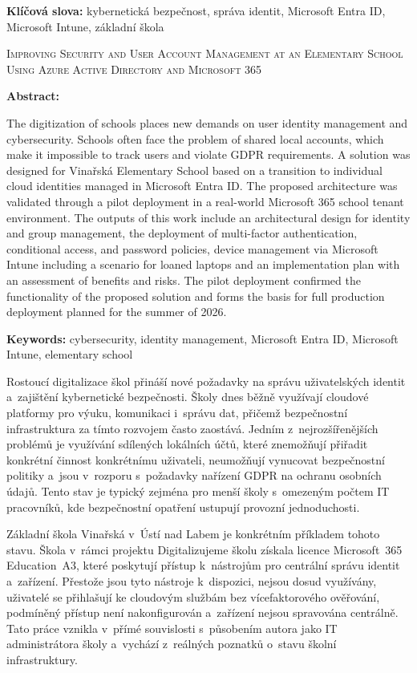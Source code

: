 \documentclass[male,czech,api_bc]{kitheses}
\newcommand{\nazeven}{Improving Security and User Account Management at an Elementary School Using Azure Active Directory and Microsoft 365}   %
\begin{document}
\textbf{Klíčová slova:} kybernetická bezpečnost, správa identit, Microsoft Entra ID, Microsoft Intune, základní škola

\bigskip


\textsc{\nazeven}

\textbf{Abstract:}

The digitization of schools places new demands on user identity management and cybersecurity. Schools often face the problem of shared local accounts, which make it impossible to track users and violate GDPR requirements.
A solution was designed for Vinařská Elementary School based on a transition to individual cloud identities managed in Microsoft Entra ID. The proposed architecture was validated through a pilot deployment in a real-world Microsoft 365 school tenant environment.
The outputs of this work include an architectural design for identity and group management, the deployment of multi-factor authentication, conditional access, and password policies, device management via Microsoft Intune including a scenario for loaned laptops and an implementation plan with an assessment of benefits and risks.
The pilot deployment confirmed the functionality of the proposed solution and forms the basis for full production deployment planned for the summer of 2026.

\textbf{Keywords:} cybersecurity, identity management, Microsoft Entra ID, Microsoft Intune, elementary school

\tableofcontents

Rostoucí digitalizace škol přináší nové požadavky na správu uživatelských 
identit a~zajištění kybernetické bezpečnosti. Školy dnes běžně využívají 
cloudové platformy pro výuku, komunikaci i~správu dat, přičemž bezpečnostní 
infrastruktura za tímto rozvojem často zaostává. Jedním z~nejrozšířenějších 
problémů je využívání sdílených lokálních účtů, které znemožňují přiřadit 
konkrétní činnost konkrétnímu uživateli, neumožňují vynucovat bezpečnostní 
politiky a~jsou v~rozporu s~požadavky nařízení GDPR na ochranu osobních 
údajů. Tento stav je typický zejména pro menší školy s~omezeným počtem 
IT pracovníků, kde bezpečnostní opatření ustupují provozní jednoduchosti.

Základní škola Vinařská v~Ústí nad Labem je konkrétním příkladem tohoto 
stavu. Škola v~rámci projektu Digitalizujeme školu získala licence 
Microsoft~365 Education~A3, které poskytují přístup k~nástrojům pro 
centrální správu identit a~zařízení. Přestože jsou tyto nástroje k~dispozici, 
nejsou dosud využívány, uživatelé se přihlašují ke cloudovým službám 
bez vícefaktorového ověřování, podmíněný přístup není nakonfigurován 
a~zařízení nejsou spravována centrálně. Tato práce vznikla v~přímé 
souvislosti s~působením autora jako IT administrátora školy a~vychází 
z~reálných poznatků o~stavu školní infrastruktury.
\end{document}
